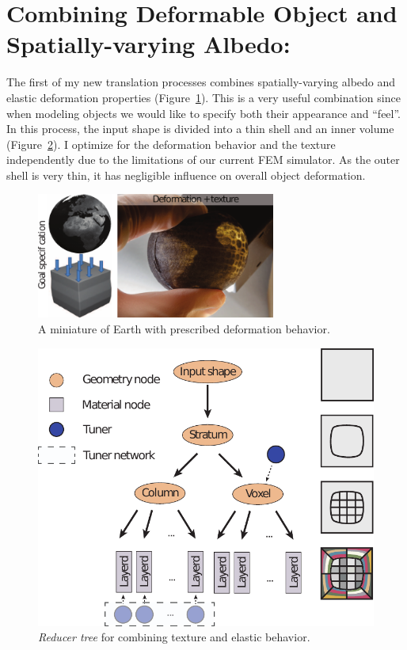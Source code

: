 \section{Combining Deformable Object and Spatially-varying Albedo:}
The first of my new translation processes combines spatially-varying albedo and elastic deformation properties
(Figure~\ref{fig:globe}).
This is a very useful combination since when modeling objects we would like to specify both their appearance and ``feel''.
In this process, the input shape is divided into a thin shell and an inner volume
(Figure~\ref{fig:treeTexDef}).
I optimize for the deformation behavior and the texture independently due to the limitations of our current FEM simulator.
As the outer shell is very thin, it has negligible influence on overall object deformation.
\begin{figure}
\centering
\includegraphics[width=0.7\textwidth]{figure/globe.pdf}
\caption {A miniature of Earth with prescribed deformation behavior.}
\label{fig:globe}
\end{figure}
\begin{figure}
\centering
\includegraphics[scale=0.7]{figure/treeTexDef.pdf}
\caption {\emph{Reducer tree} for combining texture and elastic behavior.
}
\label{fig:treeTexDef}
\end{figure}

